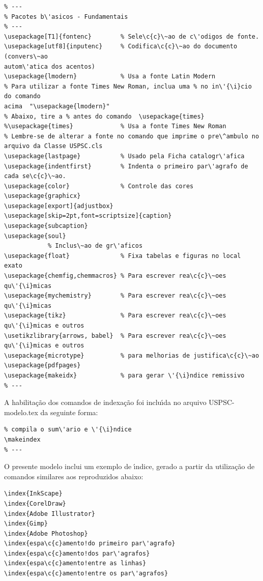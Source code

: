 \begin{verbatim}
% ---
% Pacotes b\'asicos - Fundamentais 
% ---
\usepackage[T1]{fontenc}		% Sele\c{c}\~ao de c\'odigos de fonte.
\usepackage[utf8]{inputenc}		% Codifica\c{c}\~ao do documento (convers\~ao 
autom\'atica dos acentos)
\usepackage{lmodern}			% Usa a fonte Latin Modern
% Para utilizar a fonte Times New Roman, inclua uma % no in\'{\i}cio do comando 
acima  "\usepackage{lmodern}"
% Abaixo, tire a % antes do comando  \usepackage{times}
%\usepackage{times}		    	% Usa a fonte Times New Roman	
% Lembre-se de alterar a fonte no comando que imprime o pre\^ambulo no 
arquivo da Classe USPSC.cls				
\usepackage{lastpage}			% Usado pela Ficha catalogr\'afica
\usepackage{indentfirst}		% Indenta o primeiro par\'agrafo de cada se\c{c}\~ao.
\usepackage{color}				% Controle das cores
\usepackage{graphicx}
\usepackage[export]{adjustbox}
\usepackage[skip=2pt,font=scriptsize]{caption}
\usepackage{subcaption}
\usepackage{soul}
			% Inclus\~ao de gr\'aficos
\usepackage{float} 				% Fixa tabelas e figuras no local exato
\usepackage{chemfig,chemmacros} % Para escrever rea\c{c}\~oes qu\'{\i}micas
\usepackage{mychemistry}        % Para escrever rea\c{c}\~oes qu\'{\i}micas
\usepackage{tikz}				% Para escrever rea\c{c}\~oes qu\'{\i}micas e outros
\usetikzlibrary{arrows, babel}	% Para escrever rea\c{c}\~oes qu\'{\i}micas e outros
\usepackage{microtype} 			% para melhorias de justifica\c{c}\~ao
\usepackage{pdfpages}
\usepackage{makeidx}            % para gerar \'{\i}ndice remissivo
% ---
\end{verbatim}

A habilita\c{c}\~ao dos comandos de indexa\c{c}\~ao foi inclu\'{\i}da no arquivo USPSC-modelo.tex da seguinte forma:


\begin{verbatim}
% compila o sum\'ario e \'{\i}ndice
\makeindex
% ---
\end{verbatim}

O presente modelo inclui um exemplo de \'{\i}ndice, gerado a partir da utiliza\c{c}\~ao de comandos similares aos reproduzidos abaixo:

\begin{verbatim}
\index{InkScape}
\index{CorelDraw}
\index{Adobe Illustrator}
\index{Gimp}
\index{Adobe Photoshop}
\index{espa\c{c}amento!do primeiro par\'agrafo}
\index{espa\c{c}amento!dos par\'agrafos}
\index{espa\c{c}amento!entre as linhas}
\index{espa\c{c}amento!entre os par\'agrafos}
\end{verbatim}

